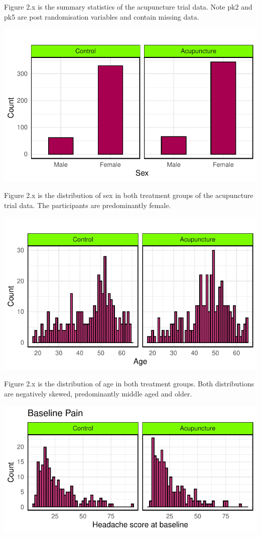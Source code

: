 \documentclass{article}
\newcommand{\pandocbounded}[1]{#1}
\begin{document}
Figure 2.x is the summary statistics of the acupuncture trial data. Note
pk2 and pk5 are post randomisation variables and contain missing data.

\pandocbounded{\includegraphics[keepaspectratio]{Final_Report_files/figure-latex/unnamed-chunk-7-1.pdf}}

Figure 2.x is the distribution of sex in both treatment groups of the
acupuncture trial data. The participants are predominantly female.

\pandocbounded{\includegraphics[keepaspectratio]{Final_Report_files/figure-latex/unnamed-chunk-8-1.pdf}}

Figure 2.x is the distribution of age in both treatment groups. Both
distributions are negatively skewed, predominantly middle aged and
older.

\pandocbounded{\includegraphics[keepaspectratio]{Final_Report_files/figure-latex/unnamed-chunk-9-1.pdf}}
\end{document}
